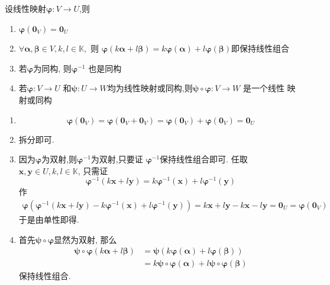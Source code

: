 \begin{formal}
\begin{theorem}[线性映射的若干性质]\label{thm:线性映射的若干性质}
    设线性映射$\bm{\varphi}:
    V \longrightarrow U$,则
    \begin{enumerate}[label=\textup{(\arabic*)}]
        \item $\bm{\varphi}\left(\bm{0}_V
        \right)=\bm{0}_U$
        \item $\forall \bm{\alpha},\bm{\beta}
         \in V,k,l \in \mathbb{K},$
            则
         $\bm{\varphi}\left(
            k\bm{\alpha} + l\bm{\beta}
         \right)=k\bm{\varphi}\left(
            \bm{\alpha}
         \right)+l\bm{\varphi}\left(
            \bm{\beta}
         \right)$即保持线性组合
         \item 若$\bm{\varphi}$为同构,
         则$\bm{\varphi}^{-1}$
            也是同构
         \item 若$\bm{\varphi}:V\longrightarrow U$
         和$\bm{\psi}:U \longrightarrow
         W$均为线性映射或同构,则$\bm{\psi}
         \circ \bm{\varphi}:
         V \longrightarrow W$
        是一个线性
        映射或同构
    \end{enumerate}
\end{theorem}
\begin{Proof}
\begin{enumerate}[label=\textup{(\arabic*)}]
    \item \[
    \bm{\varphi}\left(\bm{0}_V\right)=
    \bm{\varphi}\left(\bm{0}_V+\bm{0}_V\right)
    =\bm{\varphi}\left(\bm{0}_V\right)+\bm{\varphi}\left(\bm{0}_V\right)
    =\bm{0}_U
    \]
    \item 拆分即可.
    \item 因为$\bm{\varphi}$为双射,则$\bm{\varphi}^{-1}$为双射,只要证
    $\bm{\varphi}^{-1}$保持线性组合即可.
    任取$\bm{x},\bm{y}\in U,k,l\in\mathbb{K}$,
    只需证
    \[
    \bm{\varphi}^{-1}\left(k\bm{x}+l\bm{y}\right)=
    k\bm{\varphi}^{-1}\left(\bm{x}\right)+l
    \bm{\varphi}^{-1}\left(
        \bm{y}\right)
    \]
作
\begin{align*}
    \bm{\varphi}\left(
        \bm{\varphi}^{-1}\left(
            k\bm{x}+l\bm{y}\right)-
    k\bm{\varphi}^{-1}\left(\bm{x}\right)+l
    \bm{\varphi}^{-1}\left(
        \bm{y}\right)
    \right)=k\bm{x}+l\bm{y}-k\bm{x}-l\bm{y}=\bm{0}_U=\bm{\varphi}\left(\bm{0}_
    V\right)
\end{align*}
于是由单性即得.

\item 首先$\bm{\psi}\circ \bm{\varphi}$显然为双射,
那么
\begin{align*}
    \bm{\psi}\circ \bm{\varphi}\left(k\bm{\alpha}+l\bm{\beta}\right)&=\bm{\psi}\left(k\bm{\varphi}\left(\bm{\alpha}\right)+l\bm{\varphi}\left(\bm{\beta}\right)\right)\\
    &=k\bm{\psi}\circ\bm{\varphi}\left(\bm{\alpha}\right)+l\bm{\psi}\circ\bm{\varphi}\left(\bm{\beta}\right)
\end{align*}
保持线性组合.\qedhere
\end{enumerate}
\end{Proof}
\end{formal}

